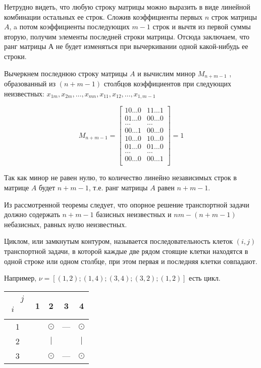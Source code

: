 \documentclass[a4paper,12pt]{article}
\begin{document}
	Нетрудно видеть, что любую строку матрицы можно выразить в виде линейной комбинации остальных ее строк. Сложив коэффициенты первых $n$ строк матрицы $A$, a потом коэффициенты последующих $m - 1$ строк и вычтя из первой суммы вторую, получим элементы последней строки матрицы. Отсюда заключаем, что ранг матрицы $А$ не будет изменяться при вычеркивании одной какой-нибудь ее строки.
	
	Вычеркнем последнюю строку матрицы $A$ и вычислим минор $M_{n + m - 1}$ , образованный из $(n + m - 1)$ столбцов коэффициентов при следующих неизвестных: $x_{1m}, x_{2m}, \ldots, x_{mn}, x_{11}, x_{12}, \ldots, x_{1, m - 1}$
	
	\begin{equation}
		M_{n + m - 1} = 
		\begin{bmatrix}
			10 \ldots 0 & 11 \ldots 1\\
			01 \ldots 0 & 00 \ldots 0\\
			\ldots & \ldots\\
			00 \ldots 1 & 00 \ldots 0\\
			10 \ldots 0 & 10 \ldots 0\\
			01 \ldots 0 & 01 \ldots 0\\
			\ldots & \ldots\\
			00 \ldots 0 & 00 \ldots 1\\
		\end{bmatrix}
		= 1
	\end{equation}
	
	Так как минор не равен нулю, то количество линейно независимых строк в матрице $A$ будет $n + m - 1$, т.е. ранг матрицы $A$ равен $n + m - 1$.
	
	Из рассмотренной теоремы следует, что опорное решение транспортной задачи должно содержать $n + m - 1$ базисных неизвестных и $nm - (n + m - 1)$ небазисных, равных нулю неизвестных.
	
	Циклом, или замкнутым контуром, называется последовательность клеток $(i, j)$ транспортной задачи, в которой каждые две рядом стоящие клетки находятся в одной строке или одном столбце, при этом первая и последняя	клетки совпадают.
	
	Например, $\nu = [(1,2);(1,4);(3,4);(3,2);(1,2)]$ есть цикл.
	
	\begin{center}
		\begin{tabular}{|c|c|c|c|c|}
			\hline
			$\begin{matrix} & j \\ i & \\ \end{matrix}$ & 1 & 2 & 3 & 4 \\ \hline
			1 &  & $\odot$ & --- & $\odot$ \\ \hline
			2 &  & $|$ &     & $|$ \\ \hline
			3 &  & $\odot$ & --- & $\odot$ \\ \hline
		\end{tabular}
	\end{center}
	
\end{document}

